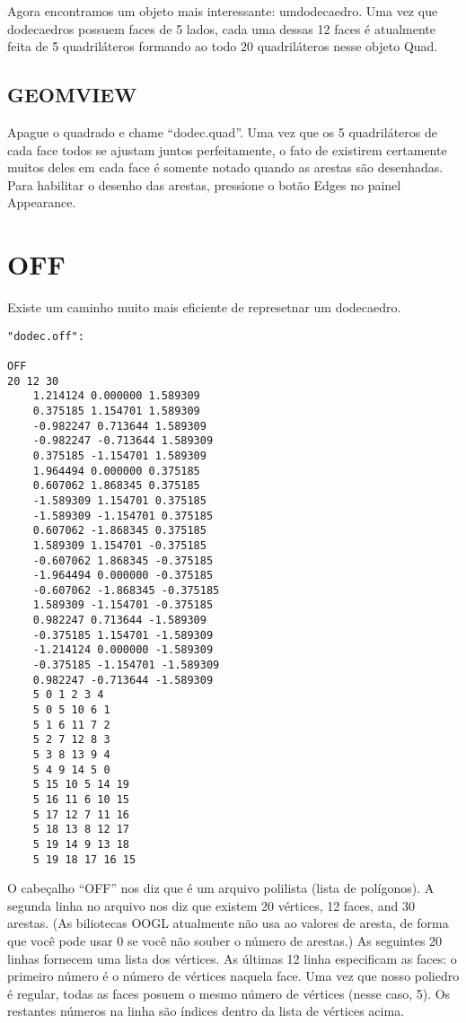 \documentclass[12pt,a4paper]{book}
\begin{document}
Agora encontramos um objeto mais interessante: umdodecaedro.  Uma vez que
dodecaedros possuem faces de 5 lados, cada uma dessas 12 faces é atualmente feita
de 5 quadriláteros formando ao todo 20 quadriláteros nesse objeto Quad.

\section{GEOMVIEW}

Apague o quadrado e chame ``dodec.quad''. Uma vez que os 5
quadriláteros de cada face todos se ajustam juntos perfeitamente, o fato de
existirem certamente muitos deles em cada face é somente notado quando as
arestas são desenhadas. Para habilitar o desenho das arestas, pressione o botão Edges no
painel Appearance.

\chapter{OFF}

Existe um caminho muito mais eficiente de represetnar um dodecaedro.

\begin{verbatim}
"dodec.off":

OFF
20 12 30
	1.214124 0.000000 1.589309
	0.375185 1.154701 1.589309
	-0.982247 0.713644 1.589309
	-0.982247 -0.713644 1.589309
	0.375185 -1.154701 1.589309
	1.964494 0.000000 0.375185
	0.607062 1.868345 0.375185
	-1.589309 1.154701 0.375185
	-1.589309 -1.154701 0.375185
	0.607062 -1.868345 0.375185
	1.589309 1.154701 -0.375185
	-0.607062 1.868345 -0.375185
	-1.964494 0.000000 -0.375185
	-0.607062 -1.868345 -0.375185
	1.589309 -1.154701 -0.375185
	0.982247 0.713644 -1.589309
	-0.375185 1.154701 -1.589309
	-1.214124 0.000000 -1.589309
	-0.375185 -1.154701 -1.589309
	0.982247 -0.713644 -1.589309
	5 0 1 2 3 4
	5 0 5 10 6 1
	5 1 6 11 7 2
	5 2 7 12 8 3
	5 3 8 13 9 4
	5 4 9 14 5 0
	5 15 10 5 14 19
	5 16 11 6 10 15
	5 17 12 7 11 16
	5 18 13 8 12 17
	5 19 14 9 13 18
	5 19 18 17 16 15
\end{verbatim}

O cabeçalho ``OFF'' nos diz que é um arquivo polilista (lista de polígonos). A segunda linha no
arquivo nos diz que existem 20 vértices, 12 faces, and 30 arestas.
(As biliotecas OOGL atualmente não usa ao valores de aresta, de forma que você pode
usar 0 se você não souber o número de arestas.)  As seguintes 20
linhas fornecem uma lista dos vértices. As últimas 12 linha especificam as faces:
o primeiro número é o número de vértices naquela face. Uma vez que nosso
poliedro é regular, todas as faces posuem o mesmo número de
vértices (nesse caso, 5).  Os restantes números na linha são
índices dentro da lista de vértices acima.
\end{document}
